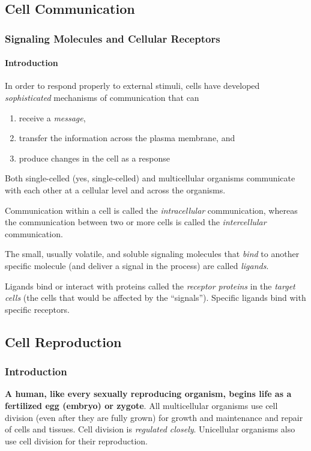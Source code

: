 \subsection{Cell Communication}
\subsubsection{Signaling Molecules and Cellular Receptors}
\paragraph{Introduction}
In order to respond properly to external stimuli, cells have developed \emph{sophisticated} mechanisms of communication that can
\begin{enumerate}
    \item receive a \emph{message},
    \item transfer the information across the plasma membrane, and
    \item produce changes in the cell as a response
\end{enumerate}
Both single-celled (yes, single-celled) and multicellular organisms communicate with each other at a cellular level and across the organisms.

Communication within a cell is called the \emph{intracellular} communication, whereas the communication between two or more cells is called the \emph{intercellular} communication.

The small, usually volatile, and soluble signaling molecules that \emph{bind} to another specific molecule (and deliver a signal in the process) are called \emph{ligands}.

Ligands bind or interact with proteins called the \emph{receptor proteins} in the \emph{target cells} (the cells that would be affected by the ``signals''). Specific ligands bind with specific receptors. 

\subsection{Cell Reproduction}
\subsubsection{Introduction}
\textbf{A human, like every sexually reproducing organism, begins life as a fertilized egg (embryo) or zygote}. All multicellular organisms use cell division (even after they are fully grown) for growth and maintenance and repair of cells and tissues. Cell division is \emph{regulated closely}. Unicellular organisms also use cell division for their reproduction. 

